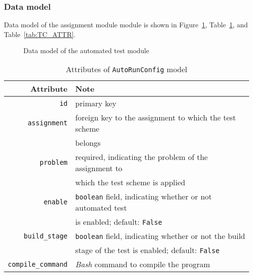 \subsubsection{Data model}
Data model of the assignment module module is shown in
Figure~\ref{fig:AUTO_ER}, Table~\ref{tab:AUTO_ATTR},
and Table~\ref{tab:TC_ATTR}. \bigskip

\begin{figure}[H]
    \centering
    \caption{Data model of the automated test module}
    \label{fig:AUTO_ER}
    \usetikzlibrary{er}

\end{figure}

\begin{table}[h]
    \centering
    \caption{Attributes of \texttt{AutoRunConfig} model}
    \label{tab:AUTO_ATTR}
    \renewcommand{\arraystretch}{1.3}
    \begin{tabular}[H]{r|l}
        \hline
        Attribute & Note \\
        \hline
        \hline

        \texttt{id} & primary key \\
        \hline
        \texttt{assignment} & foreign key to the assignment to which the test
            scheme \\ & belongs \\
        \hline
        \hline

        \texttt{problem} & required, indicating the problem of the assignment to
            \\ & which the test scheme is applied \\
        \hline
        \texttt{enable} & \texttt{boolean} field, indicating whether or not automated test \\
            & is enabled; default: \texttt{False} \\
        \hline
        \texttt{build\_stage} & \texttt{boolean} field, indicating whether or not the build \\
            & stage of the test is enabled; default: \texttt{False} \\
        \hline
        \texttt{compile\_command} & \emph{Bash} command to compile the program \\
        \hline
    \end{tabular}
    \renewcommand{\arraystretch}{1}
\end{table}

